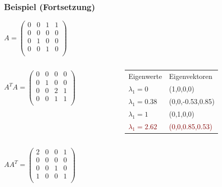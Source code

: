 \documentclass[hyperref={pdfpagelabels=false}]{beamer}
\begin{document}
\begin{frame}
\frametitle{Beispiel (Fortsetzung)}

\fontsize{10pt}{7.2}\selectfont

{\centering
$A = \begin{pmatrix}
	0& 0 & 1 & 1 \\
	0& 0 & 0 & 0 \\
	0& 1 & 0 & 0 \\
	0& 0 & 1 & 0 \\
\end{pmatrix}$\\
} 
\vspace{10pt}
\begin{minipage}[0.2\textheight]{\textwidth}
	\begin{columns}[T]
		\begin{column}{0.4\textwidth}
			$A^TA = \begin{pmatrix}
				0& 0 & 0 & 0 \\
				0& 1 & 0 & 0 \\
				0& 0 & 2 & 1 \\
				0& 0 & 1 & 1 \\
			\end{pmatrix}$
		\end{column}
		\begin{column}{0.4\textwidth}
		
		\begin{tabular}{l l}
			Eigenwerte & Eigenvektoren \\
			$\lambda_1 = 0$ & (1,0,0,0) \\ 
			$\lambda_1 = 0.38$ & (0,0,-0.53,0.85) \\
			$\lambda_1 = 1$ & (0,1,0,0) \\
			\textcolor{maroon}{$\lambda_1 = 2.62$} & \textcolor{maroon}{ (0,0,0.85,0.53)} \\
		\end{tabular}
	\end{column}
	\end{columns}
\end{minipage}

\vspace{10pt}
\begin{minipage}[0.2\textheight]{\textwidth}
	\begin{columns}[T]
		\begin{column}{0.4\textwidth}
			$AA^T = \begin{pmatrix}
			2& 0 & 0 & 1 \\
			0& 0 & 0 & 0 \\
			0& 0 & 1 & 0 \\
			1& 0 & 0 & 1 \\
			\end{pmatrix}$
		\end{column}
		\begin{column}{0.4\textwidth}


\end{column}
\end{columns}
\end{minipage}
\end{frame}
\end{document}
